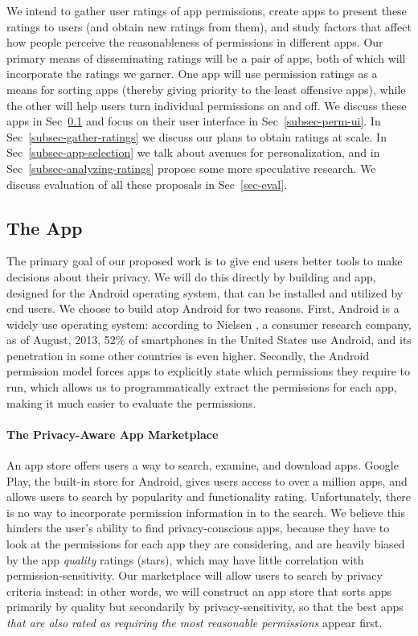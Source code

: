 \documentclass[11pt]{article}
\begin{document}
We intend to gather user ratings of app permissions, create apps to present these ratings
to users (and obtain new ratings from them), and study factors that
affect how people perceive the reasonableness of permissions in
different apps. Our primary means of disseminating ratings will be
a pair of apps, both of which will incorporate the ratings we
garner. One app will use permission ratings as a means for sorting
apps (thereby giving priority to the least offensive apps),
while the other will help users turn individual permissions on and
off. We discuss these apps in Sec~\ref{subsec-the-apps} and focus on 
their user interface in Sec~\ref{subsec-perm-ui}. In Sec~\ref{subsec-gather-ratings} 
we discuss our plans to obtain ratings at scale. In
Sec~\ref{subsec-app-selection} we talk about avenues for personalization, and in
Sec~\ref{subsec-analyzing-ratings} propose
some more speculative research.  We discuss evaluation of all these
proposals in Sec~\ref{sec-eval}.

\subsection{The App}
\label{subsec-the-apps}

The primary goal of our proposed work is to give end users better tools to make decisions
about their privacy. We will do this directly by building and app, designed for the Android 
operating system, that can be installed 
and utilized by end users. We choose to build atop Android for two reasons.
First, Android is a widely use operating system: according to Nielsen 
\cite{android-market-share}, a consumer research 
company, as of August, 2013, 52\% of smartphones in the United
States use Android, and its penetration in some other countries is
even higher.
Secondly, the Android permission model forces apps to explicitly state which permissions
they require to run, which allows us to programmatically extract the permissions for each 
app, making it much easier to evaluate the permissions. 

\paragraph{The Privacy-Aware App Marketplace}
\label{subsubsec-privacy-store}

An app store offers users a way to search, examine, and download
apps.  Google Play, the built-in store for Android, gives
users access to over a million apps, and allows users to search by
popularity and functionality rating. Unfortunately, there is no way to incorporate
permission information in to the search. We believe this hinders the
user's ability to find privacy-conscious apps, because they have to
look at the permissions for each app they are considering, and are
heavily biased by the app \emph{quality} ratings (stars), which may
have little correlation with permission-sensitivity. Our marketplace
will allow users to search by privacy criteria instead: in other
words, we will construct an app store that sorts apps primarily by
quality but secondarily by privacy-sensitivity, so that the best apps
\emph{that are also rated as requiring the most reasonable
  permissions} appear first.
\end{document}
